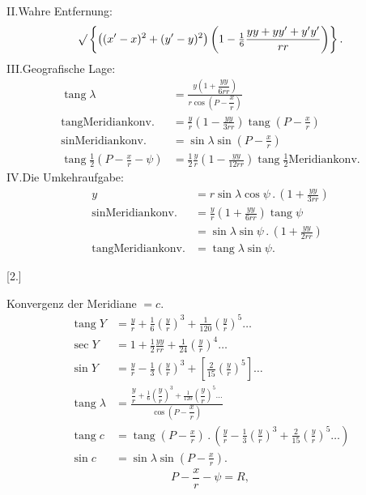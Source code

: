 II.\quad Wahre Entfernung:
\[
\surd\left\{\left((x'-x)^2+(y'-y)^2\right)
 \left(1-\tfrac16\frac{yy+yy'+y'y'}{rr}\right)\right\}.
\]
III.\quad Geografische Lage:
\[
\begin{aligned}
\operatorname{tang}\lambda&=\frac{y\left(1+\dfrac{yy}{6rr}\right)}{r\cos\left(P-\dfrac xr\right)}\\
\operatorname{tang}\text{Meridiankonv.}
 &=\frac yr\left(1-\frac{yy}{3rr}\right)\operatorname{tang}\left(P-\frac xr\right)\\
\sin\text{Meridiankonv.}&=\sin\lambda\sin\left(P-\frac xr\right)\\
\operatorname{tang}\tfrac12\left(P-\frac xr-\psi\right)
 &=\tfrac12\frac yr\left(1-\frac{yy}{12rr}\right)\operatorname{tang}\tfrac12
 \text{Meridiankonv.}
\end{aligned}
\]
IV.\quad Die Umkehraufgabe:
\[
\begin{aligned}
y&=r\sin\lambda\cos\psi\,.\,\left(1+\frac{yy}{3rr}\right)\\
\sin\text{Meridiankonv.}&=\frac yr\left(1+\frac{yy}{6rr}\right)\operatorname{tang}\psi\\
 &=\sin\lambda\sin\psi\,.\,\left(1+\frac{yy}{2rr}\right)\\
\operatorname{tang}\text{Meridiankonv.}&=\operatorname{tang}\lambda\sin\psi.
\end{aligned}
\]

\begin{center}[2.]\end{center}
Konvergenz der Meridiane \(=c\).
\[
\begin{aligned}
\operatorname{tang}Y&=\frac yr+\tfrac16\left(\frac yr\right)^3+
 \tfrac1{120}\left(\frac yr\right)^5\ldots\\
\sec Y&=1+\tfrac12\frac{yy}{rr}+\tfrac1{24}\left(\frac yr\right)^4\ldots\\
\sin Y&=\frac yr-\tfrac13\left(\frac yr\right)^3+
 \left[\tfrac2{15}\left(\frac yr\right)^5\right]\ldots\\
\operatorname{tang}\lambda&=
 \frac{\dfrac yr+\tfrac16\left(\dfrac yr\right)^3+\tfrac1{120}\left(\dfrac yr\right)^5\ldots}
 {\cos\left(P-\dfrac xr\right)}\\
\operatorname{tang}c&=\operatorname{tang}\left(P-\frac xr\right)\,.\,
 \left(\frac yr-\tfrac13\left(\frac yr\right)^3+\tfrac2{15}\left(\frac yr\right)^5\ldots\right)\\
\sin c&=\sin\lambda\sin\left(P-\frac xr\right).
\end{aligned}
\]
\[
P-\frac xr-\psi=R,
\]

